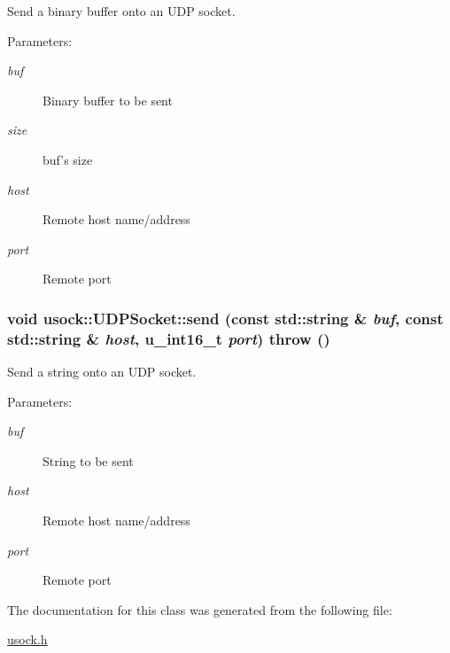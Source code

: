 Send a binary buffer onto an UDP socket. 

\begin{Desc}
\item[Parameters:]
\begin{description}
\item[{\em buf}]Binary buffer to be sent \item[{\em size}]buf's size \item[{\em host}]Remote host name/address \item[{\em port}]Remote port \end{description}
\end{Desc}
\hypertarget{classusock_1_1UDPSocket_5669548bd12ad139cc7b901cb4701e5c}{
\subsubsection[{send}]{\setlength{\rightskip}{0pt plus 5cm}void usock::UDPSocket::send (const std::string \& {\em buf}, \/  const std::string \& {\em host}, \/  u\_\-int16\_\-t {\em port})  throw ()}}
\label{classusock_1_1UDPSocket_5669548bd12ad139cc7b901cb4701e5c}


Send a string onto an UDP socket. 

\begin{Desc}
\item[Parameters:]
\begin{description}
\item[{\em buf}]String to be sent \item[{\em host}]Remote host name/address \item[{\em port}]Remote port \end{description}
\end{Desc}


The documentation for this class was generated from the following file:\begin{CompactItemize}
\item 
\hyperlink{usock_8h}{usock.h}\end{CompactItemize}

